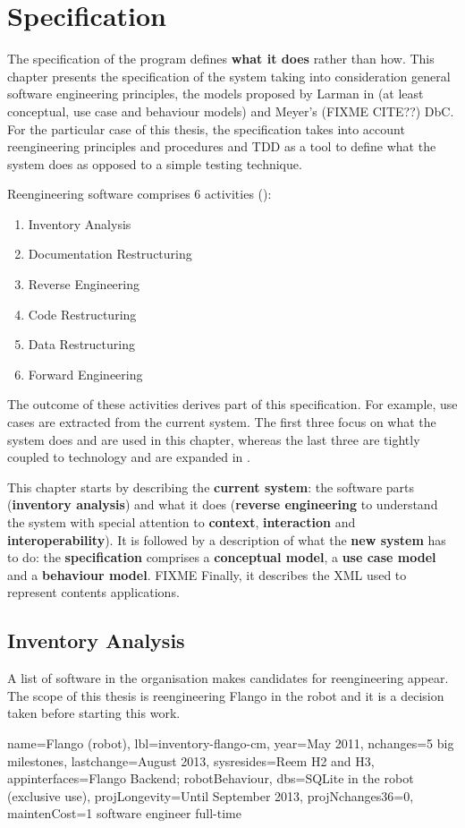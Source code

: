 \chapter{Specification}
The specification of the program defines \textbf{what it does} rather than how.
This chapter presents the specification of the system taking into consideration general software engineering principles, the models proposed by Larman  in \cite{Larman:2004} (at least conceptual, use case and behaviour models) and Meyer's (FIXME CITE??) \ac{DbC}.
For the particular case of this thesis, the specification takes into account reengineering principles and procedures and \ac{TDD} as a tool to define what the system does as opposed to a simple testing technique.

Reengineering software comprises 6 activities (): 
\begin{enumerate}
    \item Inventory Analysis
    \item Documentation Restructuring
    \item Reverse Engineering
    \item Code Restructuring
    \item Data Restructuring
    \item Forward Engineering
\end{enumerate}   
   
The outcome of these activities derives part of this specification.
For example, use cases are extracted from the current system.
The first three focus on what the system does and are used in this chapter, whereas the last three are tightly coupled to technology and are expanded in .

This chapter starts by describing the \textbf{current system}: the software parts (\textbf{inventory analysis}) and what it does (\textbf{reverse engineering} to understand the system with special attention to \textbf{context}, \textbf{interaction} and \textbf{interoperability}).
It is followed by a description of what the \textbf{new system} has to do: the \textbf{specification} comprises a \textbf{conceptual model}, a \textbf{use case model} and a \textbf{behaviour model}.
FIXME Finally, it describes the \ac{XML} used to represent contents applications.

\section{Inventory Analysis}
A list of software in the organisation makes candidates for reengineering appear.
The scope of this thesis is reengineering Flango \cm in the robot and it is a decision taken before starting this work.
\begin{inventory}
{name=Flango \cm (robot),
lbl=inventory-flango-cm, 
year=May 2011,
nchanges=5 big milestones,
lastchange=August 2013,
sysresides=Reem H2 and H3,
appinterfaces=Flango Backend; robotBehaviour,
dbs=SQLite in the robot (exclusive use),
projLongevity=Until September 2013,
projNchanges36=0,
maintenCost=1 software engineer full-time
}
\end{inventory}

